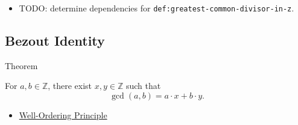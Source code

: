 \begin{dependencies}
\begin{itemize}
  \item TODO: determine dependencies for \texttt{def:greatest-common-divisor-in-z}.
\end{itemize}
\end{dependencies}

\subsection*{Bezout Identity}

\begin{theorembox}{Theorem}
\begin{theorem}
\label{thm:bezout-identity-on-z}
For $a,b\in\mathbb{Z}$, there exist $x,y\in\mathbb{Z}$ such that
\[
\gcd(a,b)=a\cdot x+b\cdot y.
\]
\end{theorem}
\end{theorembox}

\begin{dependencies}
\begin{itemize}
  \item \hyperref[thm:well-ordering-principle]{Well-Ordering Principle}
\end{itemize}
\end{dependencies}
